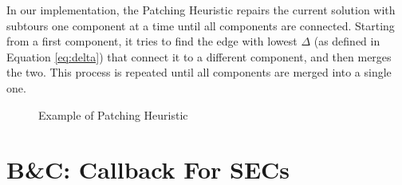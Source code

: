 In our implementation, the Patching Heuristic repairs the current solution with subtours one component at a time until all components are connected. 
Starting from a first component, it tries to find the edge with lowest $\Delta$ (as defined in Equation \ref{eq:delta}) that connect it to a different component, and then merges the two. This process is repeated until all components are merged into a single one.

\begin{figure}[!h]
    \centering
    \caption{Example of Patching Heuristic} \label{fig:patch}
\end{figure}




\section{B\&C: Callback For SECs}

